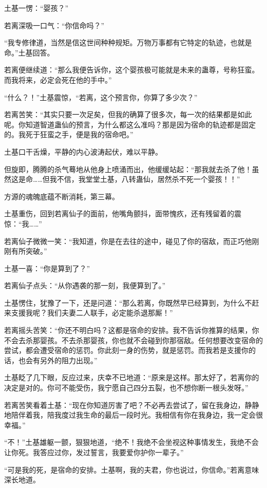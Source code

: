 \begin{this_body}
土基一愣：“婴孩？”

若离深吸一口气：“你信命吗？”

“我专修律道，当然是信这世间种种规矩。万物万事都有它特定的轨迹，也就是命。”土基回答。

若离便继续道：“那么我便告诉你，这个婴孩极可能就是未来的蛊尊，号称狂蛮。而我将来，必定会死在他的手中。”

“什么？！”土基震惊，“若离，这个预言你，你算了多少次？”

若离苦笑：“其实只要一次足矣，但我的确算了很多次，每一次的结果都是如此呢。你知道智道蛊仙的预言，为什么都这么准吗？那是因为宿命的轨迹都是固定的。我死于狂蛮之手，便是我的宿命吧。”

土基口干舌燥，平静的内心波涛起伏，难以平静。

但旋即，腾腾的杀气蓦地从他身上喷涌而出，他缓缓站起：“那我就去杀了他！虽然这是命……但我不信，我堂堂土基，八转蛊仙，居然杀不死一个婴孩！！”

方源的魂魄底蕴不断消耗，第三幕。

土基重伤，回到若离仙子的面前，他嘴角颤抖，面带愧疚，还有残留着的震惊：“我……”

若离仙子微微一笑：“我知道，你是在去往的途中，碰见了你的宿敌，而正巧他刚刚有所突破。”

土基一喜：“你是算到了？”

若离仙子点头：“从你遇袭的那一刻，我便算到了。”

土基愣住，犹豫了一下，还是问道：“那么若离，你既然早已经算到，为什么不赶来支援我呢？我们夫妻二人联手，必定能杀退那厮！”

若离摇头苦笑：“你还不明白吗？这都是宿命的安排。我不告诉你推算的结果，你不会去杀那婴孩。不去杀那婴孩，你也就不会碰到你那宿敌。任何想要改变宿命的尝试，都会遭受宿命的惩罚。你此刻一身的伤势，就是惩罚。而我若是支援你的话，也会有另外的阻力出现。”

土基眨了几下眼，反应过来，庆幸不已地道：“原来是这样。那太好了，若离你的决定是对的。你可不能受伤，我宁愿自己四分五裂，也不想你断一根头发呀。”

若离苦笑看着土基：“现在你知道厉害了吧？不必再去尝试了，留在我身边，静静地陪伴着我，陪我度过我生命的最后一段时光。我相信有你在我身边，我一定会很幸福。”

“不！”土基雄躯一颤，狠狠地道，“绝不！我绝不会坐视这种事情发生，我绝不会让你死。我答应过你，发过誓言，我要爱你护你一辈子。”

“可是我的死，是宿命的安排。土基啊，我的夫君，你也说过，你信命。”若离意味深长地道。


\end{this_body}
